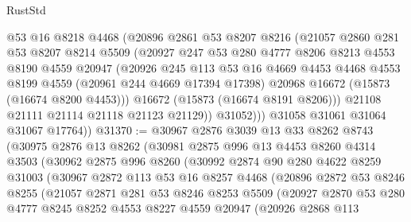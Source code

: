\begin{lexlean}{RustStd}
\begin{coremodule}
              @53
              @16
              @8218
              @4468
              (@20896
                @2861
                @53
                @8207
                @8216
                (@21057
                  @2860
                  @281
                  @53
                  @8207
                  @8214
                  @5509
                  (@20927
                    @247
                    @53
                    @280
                    @4777
                    @8206
                    @8213
                    @4553
                    @8190
                    @4559
                    @20947
                    (@20926
                      @245
                      @113
                      @53
                      @16
                      @4669
                      @4453
                      @4468
                      @4553
                      @8199
                      @4559
                      (@20961 @244 @4669 @17394 @17398)
                      @20968
                      @16672
                      (@15873 (@16674 @8200 @4453)))
                    @16672
                    (@15873 (@16674 @8191 @8206)))
                  @21108
                  @21111
                  @21114
                  @21118
                  @21123
                  @21129))
              @31052)))
        @31058
        @31061
        @31064
        @31067
        @17764))
@31370 := @30967
    @2876
    @3039
    @13
    @33
    @8262
    @8743
    (@30975
      @2876
      @13
      @8262
      (@30981
        @2875
        @996
        @13
        @4453
        @8260
        @4314
        @3503
        (@30962
          @2875
          @996
          @8260
          (@30992
            @2874
            @90
            @280
            @4622
            @8259
            @31003
            (@30967
              @2872
              @113
              @53
              @16
              @8257
              @4468
              (@20896
                @2872
                @53
                @8246
                @8255
                (@21057
                  @2871
                  @281
                  @53
                  @8246
                  @8253
                  @5509
                  (@20927
                    @2870
                    @53
                    @280
                    @4777
                    @8245
                    @8252
                    @4553
                    @8227
                    @4559
                    @20947
                    (@20926
                      @2868
                      @113

\end{coremodule}
\end{lexlean}
